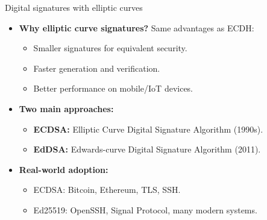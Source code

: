 \documentclass[aspectratio=169, lualatex, handout]{beamer}
\begin{document}
\begin{frame}{Digital signatures with elliptic curves}
	\begin{itemize}
		\item \textbf{Why elliptic curve signatures?} Same advantages as ECDH:
		      \begin{itemize}
			      \item Smaller signatures for equivalent security.
			      \item Faster generation and verification.
			      \item Better performance on mobile/IoT devices.
		      \end{itemize}
		\item \textbf{Two main approaches:}
		      \begin{itemize}
			      \item \textbf{ECDSA:} Elliptic Curve Digital Signature Algorithm (1990s).
			      \item \textbf{EdDSA:} Edwards-curve Digital Signature Algorithm (2011).
		      \end{itemize}
		\item \textbf{Real-world adoption:}
		      \begin{itemize}
			      \item ECDSA: Bitcoin, Ethereum, TLS, SSH.
			      \item Ed25519: OpenSSH, Signal Protocol, many modern systems.
		      \end{itemize}
	\end{itemize}
\end{frame}
\end{document}
